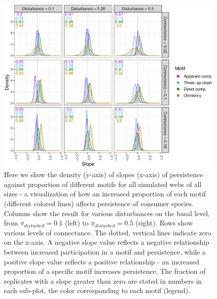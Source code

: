 \documentclass[12pt]{article}
\begin{document}
\begin{spacing}{2.0}
    \begin{figure}[hb!]
    \centering
        \includegraphics[width=\textwidth]{figures/prop_dens_bp_vs_C_allS.eps}
        \caption{Here we show the density (y-axis) of slopes (x-axis) of persistence against proportion of different motifs for all simulated webs of all sizes - a visualization of how an increased proportion of each motif (different colored lines) affects persistence of consumer species. Columns show the result for various disturbances on the basal level, from $\pi_{disturbed} = 0.1$ (left) to $\pi_{disturbed} = 0.5$ (right). Rows show various levels of connectance. The dotted, vertical lines indicate zero on the x-axis. A negative slope value reflects a negative relationship between increased participation in a motif and persistence, while a positive slope value reflects a positive relationship - an increased proportion of a specific motif increases persistence. The fraction of replicates with a slope greater than zero are stated in numbers in each sub-plot, the color corresponding to each motif (legend). }
        \label{fig:density_prop_C}
    \end{figure}    


\end{spacing}
\end{document}
